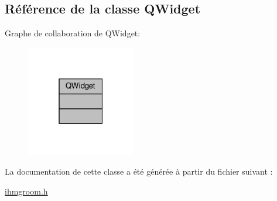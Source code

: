 \hypertarget{class_q_widget}{}\subsection{Référence de la classe Q\+Widget}
\label{class_q_widget}


Graphe de collaboration de Q\+Widget\+:
\nopagebreak
\begin{figure}[H]
\begin{center}
\leavevmode
\includegraphics[width=135pt]{class_q_widget__coll__graph}
\end{center}
\end{figure}


La documentation de cette classe a été générée à partir du fichier suivant \+:\begin{DoxyCompactItemize}
\item 
\hyperlink{ihmgroom_8h}{ihmgroom.\+h}\end{DoxyCompactItemize}
